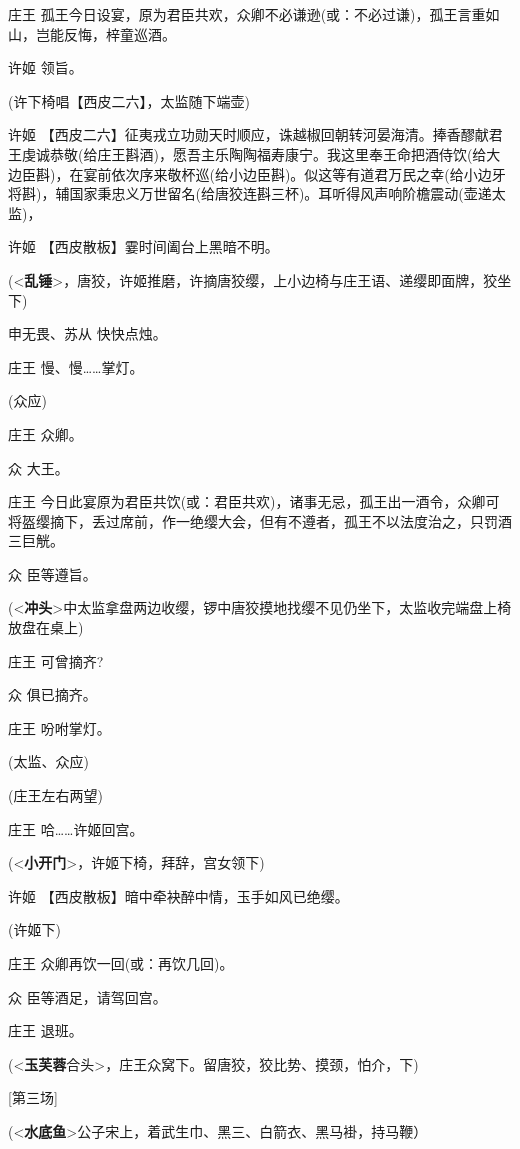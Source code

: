 庄王
孤王今日设宴，原为君臣共欢，众卿不必谦逊(或：不必过谦)，孤王言重如山，岂能反悔，梓童巡酒。

许姬 领旨。

(许下椅唱【西皮二六】，太监随下端壶)

许姬
【西皮二六】征夷戎立功勋天时顺应，诛越椒回朝转河晏海清。捧香醪献君王虔诚恭敬(给庄王斟酒)，愿吾主乐陶陶福寿康宁。我这里奉王命把酒侍饮(给大边臣斟)，在宴前依次序来敬杯巡(给小边臣斟)。似这等有道君万民之幸(给小边牙将斟)，辅国家秉忠义万世留名(给唐狡连斟三杯)。耳听得风声响阶檐震动(壶递太监)，

许姬 【西皮散板】霎时间阖台上黑暗不明。

(\textless{}\textbf{乱锤}\textgreater{}，唐狡，许姬推磨，许摘唐狡缨，上小边椅与庄王语、递缨即面牌，狡坐下)

申无畏、苏从 快快点烛。

庄王 慢、慢\ldots{}\ldots{}掌灯。

(众应)

庄王 众卿。

众 大王。

庄王
今日此宴原为君臣共饮(或：君臣共欢)，诸事无忌，孤王出一酒令，众卿可将盔缨摘下，丢过席前，作一绝缨大会，但有不遵者，孤王不以法度治之，只罚酒三巨觥。

众 臣等遵旨。

(\textless{}\textbf{冲头}\textgreater{}中太监拿盘两边收缨，锣中唐狡摸地找缨不见仍坐下，太监收完端盘上椅放盘在桌上)

庄王 可曾摘齐?

众 俱已摘齐。

庄王 吩咐掌灯。

(太监、众应)

(庄王左右两望)

庄王 哈\ldots{}\ldots{}许姬回宫。

(\textless{}\textbf{小开门}\textgreater{}，许姬下椅，拜辞，宫女领下)

许姬 【西皮散板】暗中牵袂醉中情，玉手如风已绝缨。

(许姬下)

庄王 众卿再饮一回(或：再饮几回)。

众 臣等酒足，请驾回宫。

庄王 退班。

(\textless{}\textbf{玉芙蓉}合头\textgreater{}，庄王众窝下。留唐狡，狡比势、摸颈，怕介，下)

{[}第三场{]}

(\textless{}\textbf{水底鱼}\textgreater{}公子宋上，着武生巾、黑三、白箭衣、黑马褂，持马鞭）

